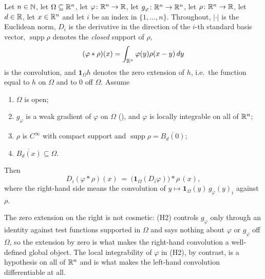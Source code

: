 \begin{helper}
Let $n\in\mathbb{N}$, let $\Omega\subseteq\mathbb{R}^n$, let $\varphi\colon\mathbb{R}^n\to\mathbb{R}$, let
$g_\varphi\colon\mathbb{R}^n\to\mathbb{R}^n$, let $\rho\colon\mathbb{R}^n\to\mathbb{R}$, let $d\in\mathbb{R}$, let
$x\in\mathbb{R}^n$ and let $i$ be an index in $\{1,\dots,n\}$.  Throughout, $|\cdot|$ is
the Euclidean norm, $D_i$ is the derivative in the direction of the $i$-th
standard basis vector, $\operatorname{supp}\rho$ denotes the \emph{closed}
support of $\rho$,
\[
(\varphi*\rho)(x)=\int_{\mathbb{R}^n}\varphi(y)\rho(x-y)\,dy
\]
is the convolution, and $\mathbf1_\Omega h$ denotes the zero extension of $h$,
i.e.\ the function equal to $h$ on $\Omega$ and to $0$ off $\Omega$.  Assume
\begin{enumerate}
\item[(H1)] $\Omega$ is open;
\item[(H2)] $g_\varphi$ is a weak gradient of $\varphi$ on $\Omega$
  (), and $\varphi$ is locally integrable on all of
  $\mathbb{R}^n$;
\item[(H3)] $\rho$ is $C^\infty$ with compact support and
  $\operatorname{supp}\rho=\overline{B_d(0)}$;
\item[(H4)] $\overline{B_d(x)}\subseteq\Omega$.
\end{enumerate}
Then
\[
D_i(\varphi*\rho)(x)\ =\ \bigl(\mathbf1_\Omega(D_i\varphi)\bigr)*\rho\,(x),
\]
where the right-hand side means the convolution of
$y\mapsto\mathbf1_\Omega(y)\,g_\varphi(y)_i$ against $\rho$.

The zero extension on the right is not cosmetic: (H2) controls $g_\varphi$ only
through an identity against test functions supported in $\Omega$ and says
nothing about $\varphi$ or $g_\varphi$ off $\Omega$, so the extension by zero is
what makes the right-hand convolution a well-defined global object.  The local
integrability of $\varphi$ in (H2), by contrast, is a hypothesis on all of
$\mathbb{R}^n$ and is what makes the left-hand convolution differentiable at all.
\end{helper}
